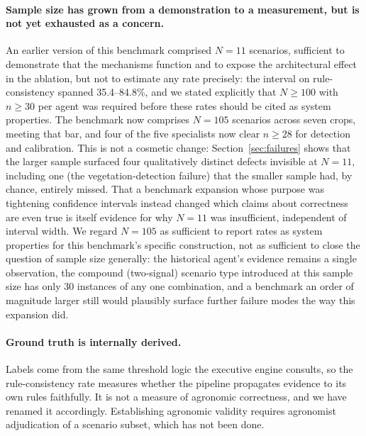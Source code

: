 \documentclass[preprint,12pt]{elsarticle}
\begin{document}
\paragraph{Sample size has grown from a demonstration to a measurement,
but is not yet exhausted as a concern.} An earlier version of this
benchmark comprised $N=11$ scenarios, sufficient to demonstrate that the
mechanisms function and to expose the architectural effect in the
ablation, but not to estimate any rate precisely: the interval on
rule-consistency spanned 35.4--84.8\%, and we stated explicitly that
$N\!\ge\!100$ with $n\!\ge\!30$ per agent was required before these rates
should be cited as system properties. The benchmark now comprises
$N=105$ scenarios across seven crops, meeting that bar, and four of the
five specialists now clear $n\!\ge\!28$ for detection and calibration.
This is not a cosmetic change: Section~\ref{sec:failures} shows that the
larger sample surfaced four qualitatively distinct defects invisible at
$N=11$, including one (the vegetation-detection failure) that the
smaller sample had, by chance, entirely missed. That a benchmark
expansion whose purpose was tightening confidence intervals instead
changed which claims about correctness are even true is itself evidence
for why $N=11$ was insufficient, independent of interval width. We
regard $N=105$ as sufficient to report rates as system properties for
this benchmark's specific construction, not as sufficient to close the
question of sample size generally: the historical agent's evidence
remains a single observation, the compound (two-signal) scenario type
introduced at this sample size has only 30 instances of any one
combination, and a benchmark an order of magnitude larger still would
plausibly surface further failure modes the way this expansion did.

\paragraph{Ground truth is internally derived.} Labels come from the same
threshold logic the executive engine consults, so the rule-consistency rate
measures whether the pipeline propagates evidence to its own rules
faithfully. It is not a measure of agronomic correctness, and we have
renamed it accordingly. Establishing agronomic validity requires
agronomist adjudication of a scenario subset, which has not been done.
\end{document}
